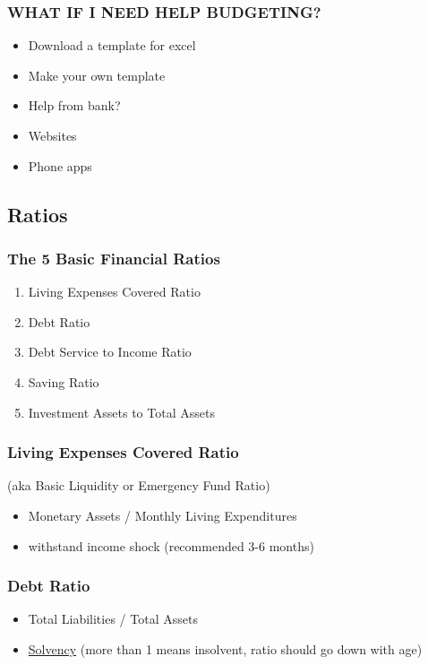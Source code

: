 \documentclass[12pt]{article}
\begin{document}
            \subsubsection{WHAT IF I NEED HELP BUDGETING?}
                \begin{itemize}
                    \item Download a template for excel
                    \item Make your own template
                    \item Help from bank?
                    \item Websites
                    \item Phone apps
                \end{itemize}

        \subsection{Ratios}
            \subsubsection{The 5 Basic Financial Ratios}
                \begin{enumerate}
                    \item Living Expenses Covered Ratio
                    \item Debt Ratio
                    \item Debt Service to Income Ratio
                    \item Saving Ratio
                    \item Investment Assets to Total Assets
                \end{enumerate}
            \subsubsection{Living Expenses Covered Ratio}
                (aka Basic Liquidity or Emergency Fund Ratio)
                \begin{itemize}
                    \item Monetary Assets / Monthly Living Expenditures
                    \item withstand income shock (recommended 3-6 months)
                \end{itemize}
            \subsubsection{Debt Ratio}
                \begin{itemize}
                    \item Total Liabilities / Total Assets
                    \item \underline{Solvency} (more than 1 means insolvent, ratio should go down with age)
                \end{itemize}
\end{document}
